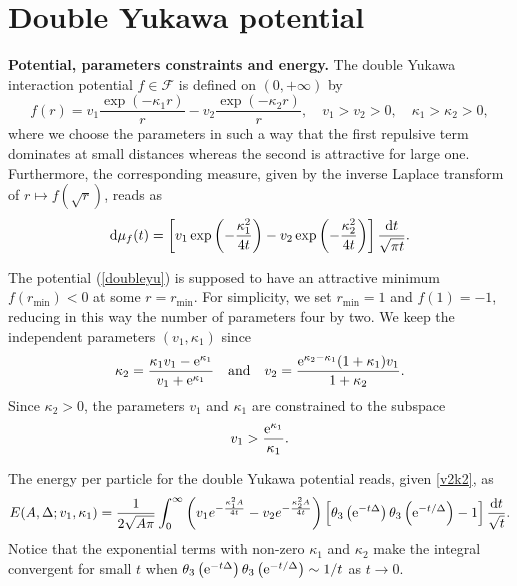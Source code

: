 \documentclass[12pt]{interact}
\theoremstyle{definition}
\begin{document}
\renewcommand{\theequation}{4.\arabic{equation}}
\setcounter{equation}{0}

\section{Double Yukawa potential} \label{Sec4}
\textbf{Potential, parameters constraints and energy.}
The double Yukawa interaction potential $f\in \mathcal{F}$ is defined on
$(0,+\infty)$ by
\begin{equation}\label{doubleyu}
f(r) = v_1 \frac{\exp{(-\kappa_1 r)}}{r} - v_2 \frac{\exp{(-\kappa_2 r)}}{r},
\quad v_1 > v_2 >0,\quad\kappa_1 > \kappa_2 > 0,
\end{equation}
where we choose the parameters in such a way that the first repulsive term
dominates at small distances whereas the second is attractive for large one.
Furthermore, the corresponding measure, given by the inverse Laplace
transform of $r\mapsto f(\sqrt{r})$, reads as
\begin{equation} \label{muft}
{\rm d}\mu_f(t) =
\left[ v_1\exp{\left(-\frac{\kappa_1^2}{4t}\right)}
-v_2\exp{\left(-\frac{\kappa_2^2}{4t}\right)}\right]
\frac{{\rm d}t}{\sqrt{\pi t}}.
\end{equation}

The potential (\ref{doubleyu}) is supposed to have an attractive minimum
$f(r_{\min})<0$ at some $r=r_{\min}$.
For simplicity, we set $r_{\min}=1$ and $f(1)=-1$, reducing in this way
the number of parameters four by two. We keep the independent parameters
$(v_1,\kappa_1)$ since
\begin{equation} \label{v2k2}
\kappa_2 = \frac{\kappa_1 v_1-{\rm e}^{\kappa_1}}{v_1+{\rm e}^{\kappa_1}}
\quad \textnormal{and}\quad
v_2 = \frac{{\rm e}^{\kappa_2-\kappa_1}(1+\kappa_1)v_1}{1+\kappa_2} .  
\end{equation} 
Since $\kappa_2>0$, the parameters $v_1$ and $\kappa_1$ are constrained
to the subspace
\begin{equation} \label{subspace}
v_1 > \frac{{\rm e}^{\kappa_1}}{\kappa_1} .  
\end{equation}

The energy per particle for the double Yukawa potential reads,
given \eqref{v2k2}, as
\begin{equation} \label{erec}
E(A,\Delta;v_1,\kappa_1) = \frac{1}{2\sqrt{A\pi}}
\int_0^\infty \left(v_1
e^{-\frac{\kappa_1^2 A}{4t}}-v_2 e^{-\frac{\kappa_2^2 A}{4t}}\right)
\left[ \theta_3\left({\rm e}^{-t\Delta}\right)
\theta_3\left({\rm e}^{-t/\Delta}\right) - 1 \right]\frac{{\rm d} t}{\sqrt{t}}.
\end{equation}
Notice that the exponential terms with non-zero $\kappa_1$ and $\kappa_2$
make the integral convergent for small $t$ when
$\theta_3\left({\rm e}^{-t\Delta}\right)
\theta_3\left({\rm e}^{-t/\Delta}\right)\sim 1/t$ as $t\to 0$.
\end{document}
